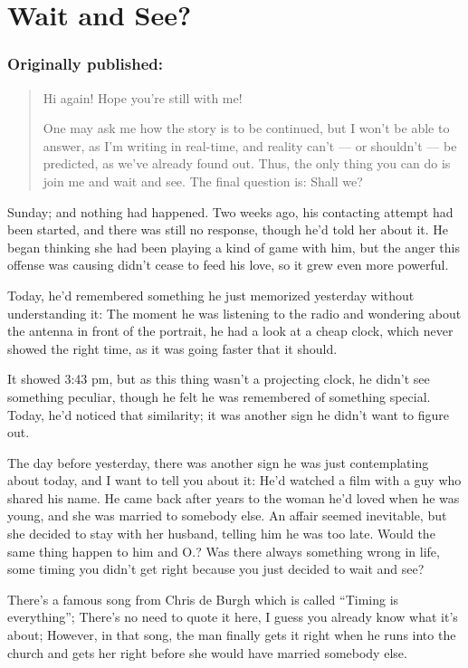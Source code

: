 \chapter{Wait and See?}
\label{cha:wait-and-see}
\subsection*{Originally published: }
\begin{quote}
Hi again! Hope you're still with me!

One may ask me how the story is to be continued, but I won't be able to answer, as I'm writing in real-time, and reality can't --- or shouldn't --- be predicted, as we've already found out. Thus, the only thing you can do is join me and wait and see. The final question is: Shall we?
\end{quote}

Sunday; and nothing had happened. Two weeks ago, his contacting attempt had been started, and there was still no response, though he'd told her about it. He began thinking she had been playing a kind of game with him, but the anger this offense was causing didn't cease to feed his love, so it grew even more powerful.

Today, he'd remembered something he just memorized yesterday without understanding it: The moment he was listening to the radio and wondering about the antenna in front of the portrait, he had a look at a cheap clock, which never showed the right time, as it was going faster that it should.

It showed 3:43 pm, but as this thing wasn't a projecting clock, he didn't see something peculiar, though he felt he was remembered of something special.
Today, he'd noticed that similarity; it was another sign he didn't want to figure out.

The day before yesterday, there was another sign he was just contemplating about today, and I want to tell you about it: He'd watched a film with a guy who shared his name. He came back after years to the woman he'd loved when he was young, and she was married to somebody else. An affair seemed inevitable, but she decided to stay with her husband, telling him he was too late. 
Would the same thing happen to him and O.?
Was there always something wrong in life, some timing you didn't get right because you just decided to wait and see?

There's a famous song from Chris de Burgh which is called \enquote{Timing is everything}; There's no need to quote it here, I guess you already know what it's about; However, in that song, the man finally gets it right when he runs into the church and gets her right before she would have married somebody else.

